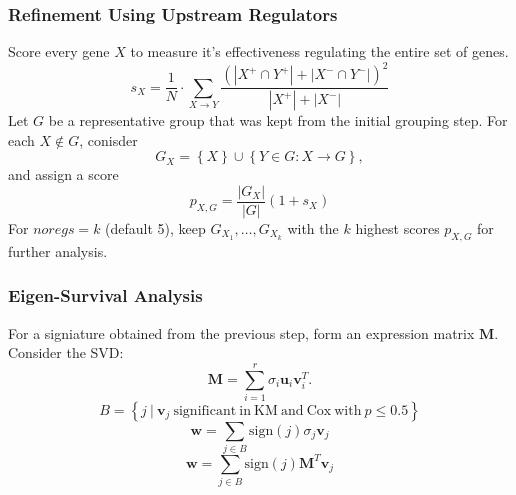 \documentclass[
	11pt, %
]{beamer}
\begin{document}
\begin{frame}
    \frametitle{Refinement Using Upstream Regulators}
    Score every gene $X$ to measure it's effectiveness regulating the entire set of genes.
    \begin{equation*}
        s_X = \frac{1}{N} \cdot \sum_{X \rightarrow Y}\frac{\left( \left| X^{+} \cap Y^{+}\right| + \left| X^{-} \cap Y^{-}\right| \right)^2}{\left| X^{+} \right| + \left| X^{-} \right|}
    \end{equation*}
    \pause
    Let $G$ be a representative group that was kept from the initial grouping step. For each $X \notin G$, conisder
    \begin{equation*}
        G_X = \left\{ X \right\} \cup \left\{ Y \in G : X \rightarrow G \right\},
    \end{equation*}
    \pause
    and assign a score
    \begin{equation*}
        p_{X,G}=\frac{\left| G_X \right|}{\left| G \right|}(1+s_X)
    \end{equation*}
    \pause
    For $noregs=k$ (default 5), keep $G_{X_1}, \ldots, G_{X_k}$ with the $k$ highest scores $p_{X,G}$ for further analysis.
\end{frame}

\begin{frame}
    \frametitle{Eigen-Survival Analysis}

    For a signiature obtained from the previous step, form an expression matrix $\mathbf{M}$. Consider the SVD:
    \begin{equation*}
        \mathbf{M} = \sum_{i=1}^{r}\sigma_i \mathbf{u}_i \mathbf{v}_i^T.
    \end{equation*}
    \pause
    \begin{equation*}
        B = \left\{ j\ |\ \mathbf{v}_j \mathrm{\ significant\ in\ KM\ and\ Cox\ with\ } p \leq 0.5 \right\}
    \end{equation*}
    \pause
    \begin{equation*}
        \mathbf{w} = \sum_{j \in B}\mathrm{sign}(j)\sigma_j \mathbf{v}_j
    \end{equation*}
    \pause
    \begin{equation*}
        \mathbf{w} = \sum_{j \in B}\mathrm{sign}(j)\mathbf{M}^{T} \mathbf{v}_j
    \end{equation*}
\end{frame}
\end{document}
